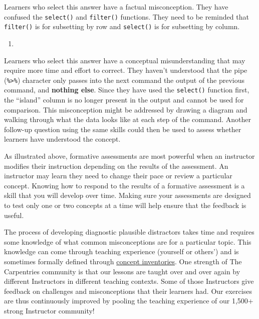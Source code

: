 \documentclass[]{book}
\newenvironment{Shaded}{\begin{snugshade}}{\end{snugshade}}
\newcommand{\DecValTok}[1]{\textcolor[rgb]{0.00,0.00,0.81}{#1}}
\newcommand{\KeywordTok}[1]{\textcolor[rgb]{0.13,0.29,0.53}{\textbf{#1}}}
\newcommand{\NormalTok}[1]{#1}
\newcommand{\OperatorTok}[1]{\textcolor[rgb]{0.81,0.36,0.00}{\textbf{#1}}}
\newcommand{\StringTok}[1]{\textcolor[rgb]{0.31,0.60,0.02}{#1}}
\begin{document}
Learners who select this answer have a factual misconception. They have confused the
\texttt{select()} and \texttt{filter()} functions. They need to be reminded that \texttt{filter()} is for
subsetting by row and \texttt{select()} is for subsetting by column.

\begin{enumerate}
\def\labelenumi{\alph{enumi}.}
\setcounter{enumi}{2}
\item
\end{enumerate}

\begin{Shaded}
\end{Shaded}

Learners who select this answer have a conceptual misunderstanding that may require more
time and effort to correct. They haven't understood that the pipe (\texttt{\%\textgreater{}\%}) character only
passes into the next command the output of the previous command, and \textbf{nothing else}. Since
they have used the \texttt{select()} function first, the ``island'' column is no longer present
in the output and cannot be used for comparison. This misconception might be addressed by
drawing a diagram and walking through what the data looks like at each step of the command.
Another follow-up question using the same skills could then be used to assess whether learners
have understood the concept.

As illustrated above, formative assessments are most powerful when an instructor modifies their
instruction depending on the
results of the assessment. An instructor may learn they need to change their pace or review a
particular concept.
Knowing how to respond to the results of a formative assessment is a skill that you will develop
over time. Making sure your assessments are designed to test only one or two concepts at a time
will help ensure that the feedback is useful.

The process of developing diagnostic plausible distractors takes time and requires some
knowledge of what common
misconceptions are for a particular topic. This knowledge can come through teaching experience
(yourself or others') and is sometimes formally defined through \href{}{concept inventories}.
One strength of The Carpentries community is that our lessons are taught over and over again
by different Instructors in different teaching contexts. Some of those Instructors give
feedback on challenges and misconceptions that their learners had. Our exercises are thus
continuously improved by pooling the teaching experience of our 1,500+ strong Instructor
community!
\end{document}
